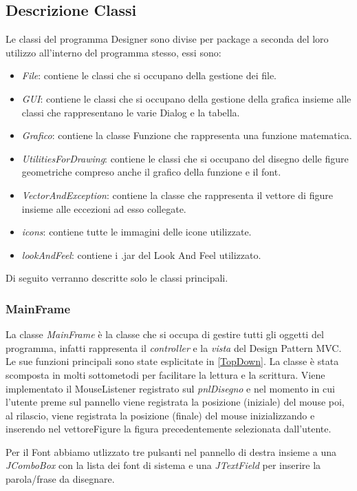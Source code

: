 \documentclass[a4paper,12pt]{article}
\begin{document}
\subsection{Descrizione Classi}
Le classi del programma Designer sono divise per package a seconda del loro utilizzo all'interno del programma stesso, essi sono:
\begin{itemize}
	\item \textit{File}: contiene le classi che si occupano della gestione dei file.
	\item \textit{GUI}: contiene le classi che si occupano della gestione della grafica insieme alle classi che rappresentano le varie Dialog e la tabella.
	\item \textit{Grafico}: contiene la classe Funzione che rappresenta una funzione matematica.
	\item \textit{UtilitiesForDrawing}: contiene le classi che si occupano del disegno delle figure geometriche compreso anche il grafico della funzione e il font.
	\item \textit{VectorAndException}: contiene la classe che rappresenta il vettore di figure insieme alle eccezioni ad esso collegate.
	\item \textit{icons}: contiene tutte le immagini delle icone utilizzate.
	\item \textit{lookAndFeel}: contiene i .jar del Look And Feel utilizzato.
\end{itemize}
Di seguito verranno descritte solo le classi principali.

\subsubsection{MainFrame} %
La classe \textit{MainFrame} è la classe che si occupa di gestire tutti gli oggetti del programma, infatti rappresenta il \textit{controller} e la \textit{vista} del Design Pattern MVC. Le sue funzioni principali sono state esplicitate in \ref{TopDown}. La classe è stata scomposta in molti sottometodi per facilitare la lettura e la scrittura. Viene implementato il MouseListener registrato sul \textit{pnlDisegno} e nel momento in cui l'utente preme sul pannello viene registrata la posizione (iniziale) del mouse poi, al rilascio, viene registrata la posizione (finale) del mouse inizializzando e inserendo nel vettoreFigure la figura precedentemente selezionata dall'utente.

Per il Font abbiamo utlizzato tre pulsanti nel pannello di destra insieme a una \textit{JComboBox} con la lista dei font di sistema e una \textit{JTextField} per inserire la parola/frase da disegnare.
\end{document}
